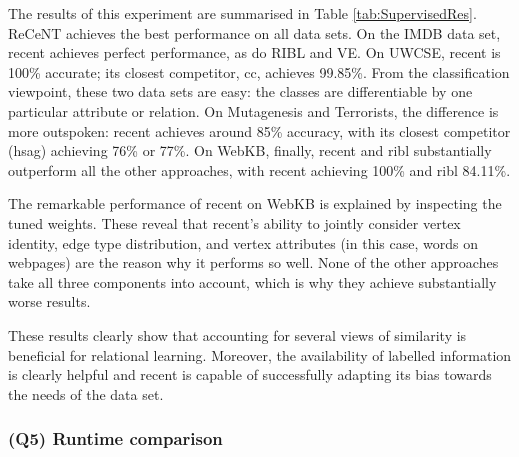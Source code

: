 The results of this experiment are summarised in Table \ref{tab:SupervisedRes}.
ReCeNT achieves the best performance on all data sets.
On the IMDB data set, \gls{recent} achieves perfect performance, as do RIBL and VE.  On UWCSE, \gls{recent} is 100\% accurate; its closest competitor, \gls{cc}, achieves 99.85\%.
From the classification viewpoint, these two data sets are easy: the classes are differentiable by one particular attribute or relation.
On Mutagenesis and Terrorists, the difference is more outspoken: \gls{recent} achieves around 85\% accuracy, with its closest competitor (\gls{hsag}) achieving 76\% or 77\%.
On WebKB, finally, \gls{recent} and \gls{ribl} substantially outperform all the other approaches, with \gls{recent} achieving 100\% and \gls{ribl} 84.11\%.

The remarkable performance of \gls{recent} on WebKB is explained by inspecting the tuned weights.  These reveal that \gls{recent}'s ability to jointly consider vertex identity, edge type distribution, and vertex attributes (in this case, words on webpages) are the reason why it performs so well.  None of the other approaches take all three components into account, which is why they achieve substantially worse results.

These results clearly show that accounting for several views of similarity is beneficial for relational learning.
Moreover, the availability of labelled information is clearly helpful and \gls{recent} is capable of successfully adapting its bias towards the needs of the data set.





\subsubsection{\textbf{(Q5) Runtime comparison}}

